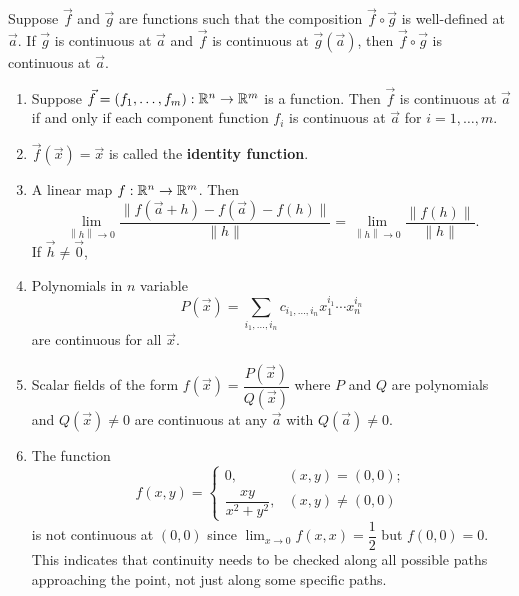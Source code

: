 \documentclass[a4paper]{ctexart}
\begin{document}
    \begin{mythm}
        Suppose $\vec f$ and $\vec g$ are functions such that the composition $\vec f \circ \vec g$ is well-defined at $\vec a$. If $\vec g$ is continuous at $\vec a$ and $\vec f$ is continuous at $\vec g(\vec a)$, then $\vec f \circ \vec g$ is continuous at $\vec a$.
    \end{mythm}
    \begin{myex}
        \begin{enumerate}
            \item Suppose $\vec f=(f_1, \ldots, f_m):\mathbb{R}^n \to \mathbb{R}^m$ is a function. Then $\vec f$ is continuous at $\vec a$ if and only if each component function $f_i$ is continuous at $\vec a$ for $i=1, \ldots, m$.
            \item $\vec f(\vec x) = \vec x$ is called the \textbf{identity function}.
            \item A linear map $f:\mathbb{R}^n \to \mathbb{R}^m$. Then
            $$ \lim_{\left\|h\right\| \to 0} \frac{\| f(\vec a + h) - f(\vec a) - f(h)\|}{\| h\|} = \lim_{\left\|h\right\| \to 0} \frac{\| f(h)\|}{\| h\|}.$$
            If $\vec h \ne \vec 0$,
            \item Polynomials in $n$ variable
            $$ P(\vec x) = \sum_{i_1, \ldots, i_n} c_{i_1, \ldots, i_n} x_1^{i_1} \cdots x_n^{i_n} $$
            are continuous for all $\vec x$.
            \item Scalar fields of the form $f(\vec x) = \dfrac{P(\vec x)}{Q(\vec x)}$ where $P$ and $Q$ are polynomials and $Q(\vec x) \ne 0$ are continuous at any $\vec a$ with $Q(\vec a) \ne 0$.
            \item The function
            $$ f(x,y) = \begin{cases}
                0, & (x,y) = (0,0); \\[6pt]
                \dfrac{xy}{x^2 + y^2}, & (x,y) \ne (0,0)
            \end{cases}
            $$
            is not continuous at $(0,0)$ since $\displaystyle \lim_{x\to 0} f(x,x) = \dfrac{1}{2}$ but $f(0,0) = 0$. This indicates that continuity needs to be checked along all possible paths approaching the point, not just along some specific paths.
        \end{enumerate}
    \end{myex}
\end{document}
